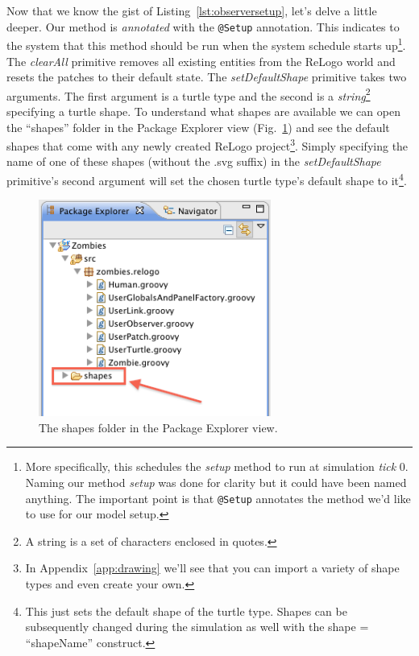 \documentclass[11pt]{amsart}
\begin{document}
Now that we know the gist of Listing~\ref{lst:observersetup}, let's delve a little deeper. Our method is \emph{annotated} with the \texttt{@Setup} annotation. This indicates to the system that this method should be run when the system schedule starts up\footnote{More specifically, this schedules the \emph{setup} method to run at simulation \emph{tick} 0. Naming our method \emph{setup} was done for clarity but it could have been named anything. The important point is that \texttt{@Setup} annotates the method we'd like to use for our model setup.}. The \emph{clearAll} primitive removes all existing entities from the ReLogo world and resets the patches to their default state. The \emph{setDefaultShape} primitive takes two arguments. The first argument is a turtle type and the second is a \emph{string}\footnote{A string is a set of characters enclosed in quotes.} specifying a turtle shape. To understand what shapes are available we can open the ``shapes'' folder in the Package Explorer view (Fig.~\ref{fig:shapes}) and see the default shapes that come with any newly created ReLogo project\footnote{In Appendix~\ref{app:drawing} we'll see that you can import a variety of shape types and even create your own.}. Simply specifying the name of one of these shapes (without the .svg suffix) in the \emph{setDefaultShape} primitive's second argument will set the chosen turtle type's default shape to it\footnote{This just sets the default shape of the turtle type. Shapes can be subsequently changed during the simulation as well with the shape = ``shapeName'' construct.}.

\begin{figure}
\begin{center}
\vspace{.2in}
\centerline {
\includegraphics[width=3in]{GettingStartedImages/Shapes.png}
}
\caption{The shapes folder in the Package Explorer view.}
\label{fig:shapes}
\end{center}
\end{figure}
\end{document}
